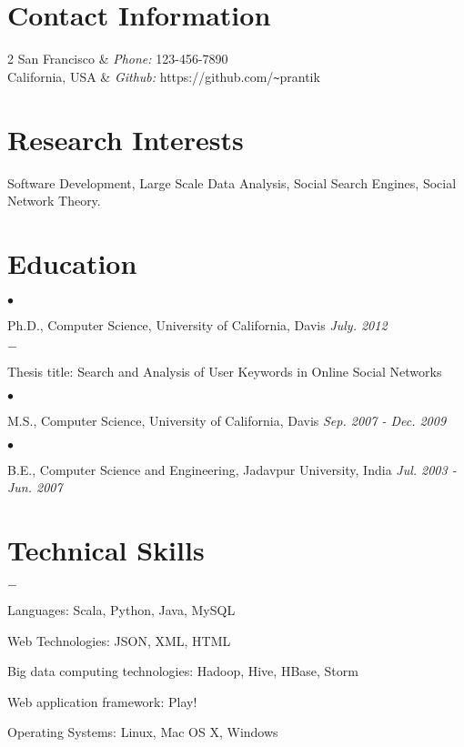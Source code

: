 \documentclass[line]{latex_lib/resume}
\newenvironment{list1}{
  \begin{list}{$\bullet$}{%
      \setlength{\itemsep}{0in}
      \setlength{\parsep}{0in} \setlength{\parskip}{0in}
      \setlength{\topsep}{0in} \setlength{\partopsep}{0in} 
      \setlength{\leftmargin}{0.11in}}}{\end{list}}
\newenvironment{list2}{
  \begin{list}{$-$}{%
      \setlength{\itemsep}{0in}
      \setlength{\parsep}{0in} \setlength{\parskip}{0in}
      \setlength{\topsep}{0in} \setlength{\partopsep}{0in} 
      \setlength{\leftmargin}{0.175in}}}{\end{list}
}
\begin{document}

\begin{resume}
\section{\sc \bf Contact Information}
\begin{ncolumn}{2}
San Francisco 	&   {\it Phone:} 123-456-7890\\ 
California, USA &   {\it Github:} https://github.com/\verb+~+prantik\\ 
\end{ncolumn}

\section{\sc \bf Research Interests}
Software Development, Large Scale Data Analysis, 
Social Search Engines, Social Network Theory.

\section{\sc \bf Education}
\begin{list1}
\item Ph.D., Computer Science, University of California, Davis \hfill{\it{July. 2012}} 
\begin{list2}
\item Thesis title: Search and Analysis of User Keywords in Online Social Networks
\end{list2}
\end{list1}

\begin{list1}
\item M.S., Computer Science,  University of California, Davis \hfill{\it{Sep. 2007 - Dec. 2009}}
\end{list1}

\begin{list1}
\item B.E., Computer Science and Engineering, Jadavpur University, India \hfill{\it{Jul. 2003 - Jun. 2007}}
\end{list1}


\section{\sc \bf Technical Skills} 
\begin{list2}
\item Languages:  Scala, Python, Java, MySQL
\item	Web Technologies: JSON, XML, HTML
\item	Big data computing technologies: Hadoop, Hive, HBase, Storm
\item	Web application framework: Play! 
\item Operating Systems: Linux, Mac OS X, Windows 
\end{list2}



\end{resume}
\end{document}
